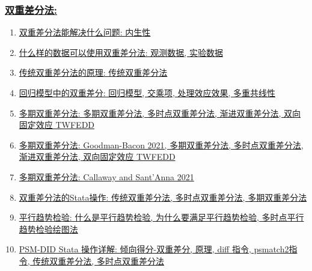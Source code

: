 \documentclass[11pt]{article}
\begin{document}
\vspace{-1cm}

\subsubsection*{\href{https://space.bilibili.com/421438815/lists/1198304?type=season}{\kaishu 双重差分法:}}

\vspace{-0.5cm}

\begin{enumerate}
	\item \href{https://mp.weixin.qq.com/s/hd0cyK7_s-m_cQZSjnymBA}{双重差分法能解决什么问题: 内生性} 
	\item \href{https://mp.weixin.qq.com/s/uiWIRXBlNuRlq8k_SYDflg}{什么样的数据可以使用双重差分法: 观测数据, 实验数据}
	\item \href{https://mp.weixin.qq.com/s/MS3Rn4NY8rDX-j72EB0vRQ}{传统双重差分法的原理: 传统双重差分法}
	\item \href{https://mp.weixin.qq.com/s/2mCL9qHAlBV7bb4JppmqkQ}{回归模型中的双重差分: 回归模型, 交乘项, 处理效应效果, 多重共线性}
	\item \href{https://mp.weixin.qq.com/s/-VCGEIqwM3_UmhVVRFuNIw}{多期双重差分法: 多期双重差分法, 多时点双重差分法, 渐进双重差分法, 双向固定效应 TWFEDD}
	\item \href{https://mp.weixin.qq.com/s/RH09elfRxOXKtwrMckMqug}{多期双重差分法: Goodman-Bacon 2021, 多期双重差分法, 多时点双重差分法, 渐进双重差分法, 双向固定效应 TWFEDD} 
	\item \href{https://mp.weixin.qq.com/s/y20wjXRJT_6NTK5WSyw30Q}{多期双重差分法: Callaway and Sant'Anna 2021}
	\item \href{https://mp.weixin.qq.com/s/nxRKvMzpSvJ47M5ZLxt2cw}{双重差分法的Stata操作: 传统双重差分法, 多时点双重差分法, 多期双重差分法}
	\item \href{https://mp.weixin.qq.com/s/Jm75Tln1UtBEfKKxXpwUFQ}{平行趋势检验: 什么是平行趋势检验, 为什么要满足平行趋势检验, 多时点平行趋势检验绘图法}
	\item \href{https://mp.weixin.qq.com/s/H8tLUsHymTao7jHBnTWr2g}{PSM-DID Stata 操作详解: 倾向得分-双重差分, 原理, diff 指令, psmatch2指令, 传统双重差分法, 多时点双重差分法}
\end{enumerate}
\end{document}
